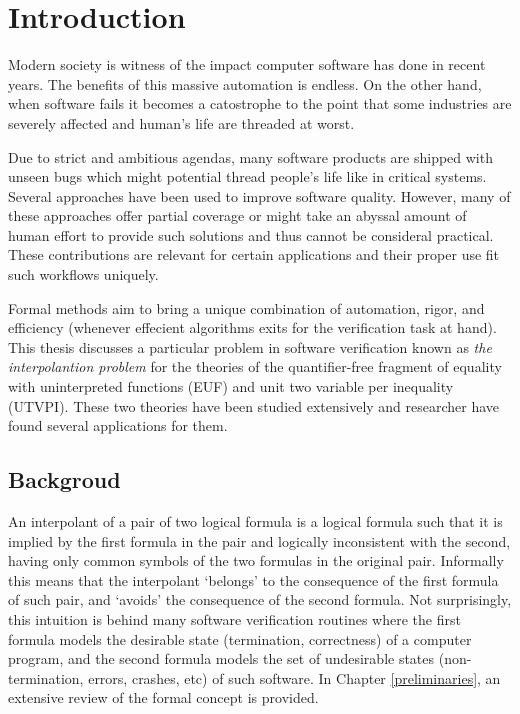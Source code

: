 \chapter{Introduction}

Modern society is witness of the impact computer software has done
in recent years. The benefits of this massive automation is endless. On the
other hand, when software fails it becomes a catostrophe to the point that
some industries are severely affected and human's life are threaded 
at worst. 

Due to strict and ambitious agendas, many software products
are shipped with unseen bugs which might potential thread people's life
like in critical systems. Several approaches have been used to improve 
software quality. However, many of these approaches offer partial 
coverage or might take an abyssal amount of human effort to provide 
such solutions and thus cannot be consideral practical. These contributions 
are relevant for certain applications and their proper use fit 
such workflows uniquely. 

Formal methods aim to bring a unique combination of automation, rigor, and 
efficiency (whenever effecient algorithms exits for the verification task
at hand). This thesis discusses a particular problem in software verification
known as \emph{the interpolantion problem} for the theories of the quantifier-free
fragment of equality with uninterpreted functions (EUF) and unit two variable per
inequality (UTVPI). These two theories have been studied extensively and 
researcher have found several applications for them. 

\section{Backgroud}

An interpolant of a pair of two logical formula is a logical formula
such that it is implied by the first formula in the pair and logically
inconsistent with the second, having only common symbols of the two formulas
in the original pair. Informally this means that the interpolant `belongs'
to the consequence of the first formula of such pair, and `avoids' the 
consequence of the second formula. Not surprisingly, this intuition is 
behind many software verification routines where the first formula models
the desirable state (termination, correctness) of a computer program, 
and the second formula models the set of undesirable states (non-termination, errors, crashes,
etc) of such software. In Chapter \ref{preliminaries}, an extensive review
of the formal concept is provided.

